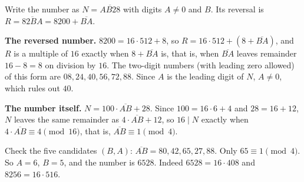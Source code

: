 Write the number as $N=\overline{AB28}$ with digits $A\ne0$ and $B$. Its reversal is $R=\overline{82BA}=8200+\overline{BA}$.

\textbf{The reversed number.} $8200=16\cdot512+8$, so $R=16\cdot512+\left(8+\overline{BA}\right)$, and $R$ is a multiple of $16$ exactly when $8+\overline{BA}$ is, that is, when $\overline{BA}$ leaves remainder $16-8=8$ on division by $16$. The two-digit numbers (with leading zero allowed) of this form are $08,24,40,56,72,88$. Since $A$ is the leading digit of $N$, $A\ne0$, which rules out $40$.

\textbf{The number itself.} $N=100\cdot\overline{AB}+28$. Since $100=16\cdot6+4$ and $28=16+12$, $N$ leaves the same remainder as $4\cdot\overline{AB}+12$, so $16\mid N$ exactly when $4\cdot\overline{AB}\equiv4\pmod{16}$, that is, $\overline{AB}\equiv1\pmod4$.

Check the five candidates $(B,A)$: $\overline{AB}=80,42,65,27,88$. Only $65\equiv1\pmod4$. So $A=6$, $B=5$, and the number is $\boxed{6528}$. Indeed $6528=16\cdot408$ and $8256=16\cdot516$.
